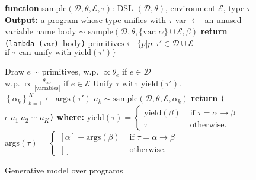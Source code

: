 \documentclass{article}
\newcommand{\code}[1]{{\footnotesize\texttt{#1}}}
\begin{document}
\begin{figure}[H]
  \centering
  \begin{minipage}{0.5\textwidth}    
    \begin{algorithm}[H]
       \caption{Generative model over programs}
       \label{programGenerativeModel}
       \begin{algorithmic}
         \STATE \textbf{function} sample$(\mathcal{D}, \theta, \mathcal{E}, \tau)$:
       DSL $(\mathcal{D},\theta)$, environment $\mathcal{E}$, type $\tau$
      \STATE \textbf{Output:} a program whose type unifies with $\tau$
      \IF{$\tau = \alpha\to\beta$}
      \STATE var $\gets$ an unused variable name
      \STATE body $\sim$ sample$(\mathcal{D},\theta,\{\text{var}:\alpha\}\cup\mathcal{E},\beta)$
       \STATE \textbf{return} \code{(lambda (}var\code{) }body\code{)}
       \ENDIF
       \STATE $\text{primitives} \gets\{p | p: \tau' \in \mathcal{D}\cup\mathcal{E}$ \\
          \hspace*{6.9em}$\text{if }\tau\text{ can unify with yield}(\tau') \} $
       
       \STATE Draw $e\sim \text{primitives}$, w.p. $\propto\theta_e$ if $e\in \mathcal{D}$ \\
          \hspace*{8.8em}w.p. $\propto\frac{\theta_{var}}{|\text{variables}|}$ if $e\in \mathcal{E}$
       \STATE Unify $\tau$ with yield$(\tau')$.
       \STATE $\left\{\alpha_k \right\}_{k = 1}^K\gets\text{args}(\tau')$ 
     \STATE $a_k\sim\text{sample}(\mathcal{D},\theta,\mathcal{E},\alpha_k)$
     \ENDFOR
     \STATE \textbf{return} \code{(}$e\;a_1\; a_2\; \cdots\; a_K$\code{)}
     \STATE\textbf{where:}
     \STATE yield$(\tau) = \begin{cases}
       \text{yield}(\beta)   &\text{ if }\tau = \alpha\to \beta\\
       \tau   &\text{ otherwise.}
     \end{cases}$ 
     \STATE  args$(\tau) = \begin{cases}
       [\alpha] + \text{args}(\beta)   &\text{ if }\tau = \alpha\to \beta\\
       []   &\text{ otherwise.}
     \end{cases}$
    \end{algorithmic}
    \end{algorithm}
  \end{minipage}
\end{figure}
\end{document}
